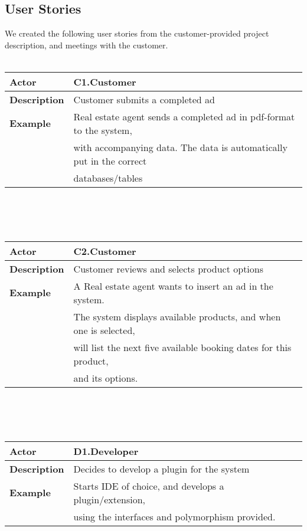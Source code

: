 \subsection{User Stories}

We created the following user stories from the customer-provided project
description, and meetings with the customer.
\\\\
\begin{tabular}{| l | l |}
	\hline
	\textbf{Actor} & C1.Customer \\
	\hline
	\textbf{Description} & Customer submits a completed ad \\
	\hline
	\textbf{Example} & Real estate agent sends a completed ad in pdf-format to the system,\\
	& with accompanying data. The data is automatically put in the correct\\
	& databases/tables \\
	\hline
	
\end{tabular}
\\\\\\
\begin{tabular}{| l | l |}
	\hline
	\textbf{Actor} & C2.Customer \\
	\hline
	\textbf{Description} & Customer reviews and selects product options \\
	\hline
	\textbf{Example} & A Real estate agent wants to insert an ad in the system.\\
	& The system displays available products, and when one is selected,\\
	& will list the next five available booking dates for this product,\\
	& and its options.\\
	\hline
	
\end{tabular}
\\\\\\
\begin{tabular}{| l | l |}
	\hline
	\textbf{Actor} & D1.Developer \\
	\hline
	\textbf{Description} & Decides to develop a plugin for the system \\
	\hline
	\textbf{Example} & Starts IDE of choice, and develops a plugin/extension,\\
	& using the interfaces and polymorphism provided. \\
	\hline
	
\end{tabular}

